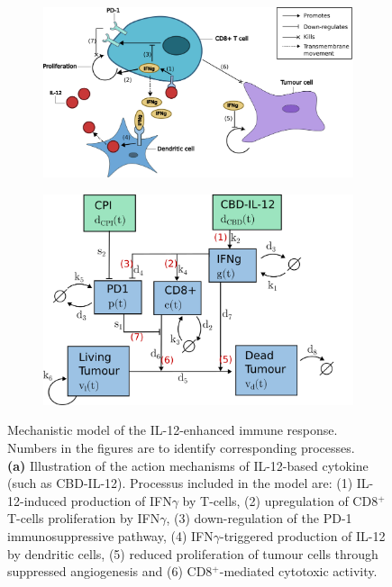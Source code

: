 \documentclass[11pt]{article}
\begin{document}
\begin{figure}[!ht]
    \centering
    \begin{subfigure}{.49\textwidth}
        \centering\includegraphics[scale=0.3]{finalBM.png}
        \caption{}        
    \end{subfigure}
    \begin{subfigure}{.49\textwidth}
        \centering\includegraphics[scale=0.3]{finalCP.png}    
        \caption{}
    \end{subfigure}
    \caption{Mechanistic model of the IL-12-enhanced immune response. Numbers in the figures are to identify corresponding processes. \\
    \textbf{(a)} Illustration of the action mechanisms of IL-12-based cytokine (such as CBD-IL-12). Processus included in the model are: (1) IL-12-induced production of IFN$\gamma$ by T-cells, (2) upregulation of CD8$^+$ T-cells proliferation by IFN$\gamma$, (3) down-regulation of the PD-1 immunosuppressive pathway, (4) IFN$\gamma$-triggered production of IL-12 by dendritic cells, (5) reduced proliferation of tumour cells through suppressed angiogenesis and (6) CD8$^+$-mediated cytotoxic activity.\\
}
\end{figure}
\end{document}

